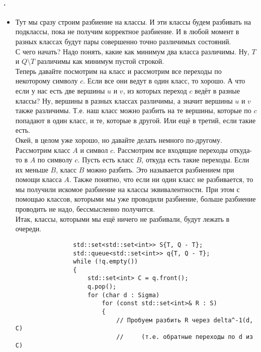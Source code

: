 \documentclass{article}
\begin{document}
    \paragraph{.}
    \begin{itemize}
        \item[]
        \begin{Comment}
            Тут мы сразу строим разбиение на классы. И эти классы будем разбивать на подклассы, пока не получим корректное разбиение. И в любой момент в разных классах будут пары совершенно точно различимых состояний.\\
            С чего начать? Надо понять, какие как минимум два класса различимы. Ну, $T$ и $Q\setminus T$ различимы как минимум пустой строкой.\\
            Теперь давайте посмотрим на класс и рассмотрим все переходы по некоторому символу $c$. Если все они ведут в один класс, то хорошо. А что если у нас есть две вершины $u$ и $v$, из которых переход $c$ ведёт в разные классы? Ну, вершины в разных классах различимы, а значит вершины $u$ и $v$ также различимы. Т.е. наш класс можно разбить на те вершины, которые по $c$ попадают в один класс, и те, которые в другой. Или ещё в третий, если такие есть.\\
            Окей, в целом уже хорошо, но давайте делать немного по-другому. Рассмотрим класс $A$ и символ $c$. Рассмотрим все входящие переходы откуда-то в $A$ по символу $c$. Пусть есть класс $B$, откуда есть такие переходы. Если их меньше $B$, класс $B$ можно разбить. Это называется разбиением при помощи класса $A$. Также понятно, что если ни один класс не разбивается, то мы получили искомое разбиение на классы эквивалентности. При этом с помощью классов, которыми мы уже проводили разбиение, больше разбиение проводить не надо, бессмысленно получится.\\
            Итак, классы, которыми мы ещё ничего не разбивали, будут лежать в очереди.
            \begin{verbatim}
                std::set<std::set<int>> S{T, Q - T};
                std::queue<std::set<int>> q{T, Q - T};
                while (!q.empty())
                {
                    std::set<int> C = q.front();
                    q.pop();
                    for (char d : Sigma)
                        for (const std::set<int>& R : S)
                        {
                            // Пробуем разбить R через delta^-1(d, C)
                            //     (т.е. обратные переходы по d из C)

\end{verbatim}
\end{Comment}
\end{itemize}
\end{document}
